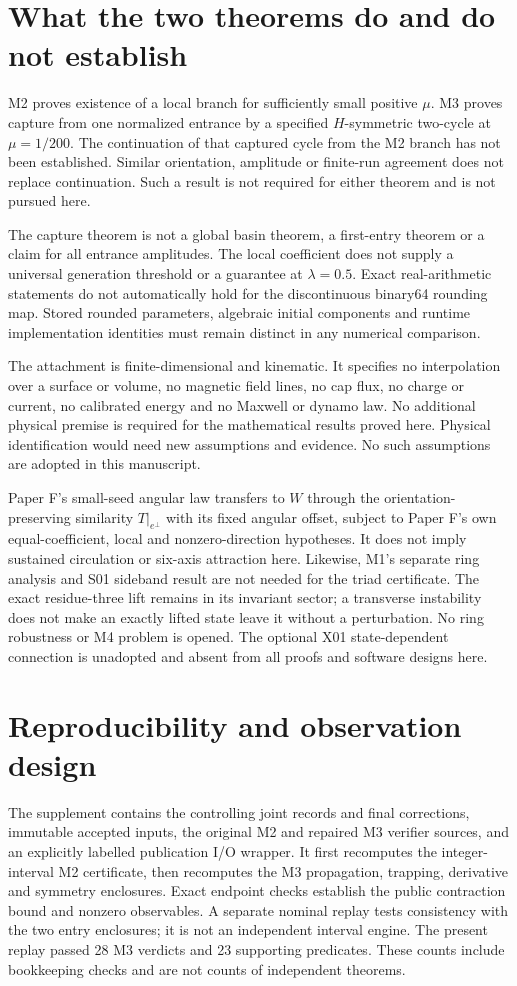 \documentclass[11pt,a4paper]{article}
\begin{document}
\section{What the two theorems do and do not establish}
M2 proves existence of a local branch for sufficiently small positive $\mu$. M3 proves capture from one normalized entrance by a specified $H$-symmetric two-cycle at $\mu=1/200$. The continuation of that captured cycle from the M2 branch has not been established. Similar orientation, amplitude or finite-run agreement does not replace continuation. Such a result is not required for either theorem and is not pursued here.

The capture theorem is not a global basin theorem, a first-entry theorem or a claim for all entrance amplitudes. The local coefficient does not supply a universal generation threshold or a guarantee at $\lambda=0.5$. Exact real-arithmetic statements do not automatically hold for the discontinuous binary64 rounding map. Stored rounded parameters, algebraic initial components and runtime implementation identities must remain distinct in any numerical comparison.

The attachment is finite-dimensional and kinematic. It specifies no interpolation over a surface or volume, no magnetic field lines, no cap flux, no charge or current, no calibrated energy and no Maxwell or dynamo law. No additional physical premise is required for the mathematical results proved here. Physical identification would need new assumptions and evidence. No such assumptions are adopted in this manuscript.

Paper F's small-seed angular law transfers to $W$ through the orientation-preserving similarity $T|_{e^\perp}$ with its fixed angular offset, subject to Paper F's own equal-coefficient, local and nonzero-direction hypotheses. It does not imply sustained circulation or six-axis attraction here. Likewise, M1's separate ring analysis and S01 sideband result are not needed for the triad certificate. The exact residue-three lift remains in its invariant sector; a transverse instability does not make an exactly lifted state leave it without a perturbation. No ring robustness or M4 problem is opened. The optional X01 state-dependent connection is unadopted and absent from all proofs and software designs here.

\section{Reproducibility and observation design}
The supplement contains the controlling joint records and final corrections, immutable accepted inputs, the original M2 and repaired M3 verifier sources, and an explicitly labelled publication I/O wrapper. It first recomputes the integer-interval M2 certificate, then recomputes the M3 propagation, trapping, derivative and symmetry enclosures. Exact endpoint checks establish the public contraction bound and nonzero observables. A separate nominal replay tests consistency with the two entry enclosures; it is not an independent interval engine. The present replay passed 28 M3 verdicts and 23 supporting predicates. These counts include bookkeeping checks and are not counts of independent theorems.
\end{document}
